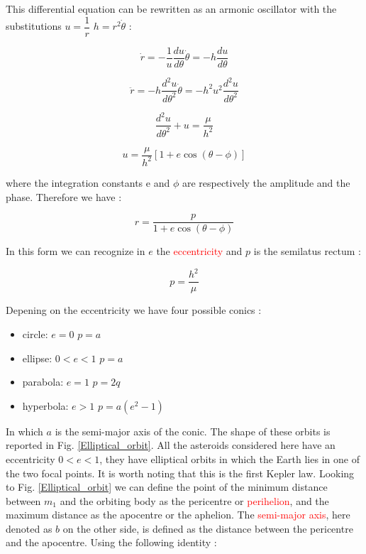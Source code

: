 \documentclass[12pt,%
               a4paper,%
               oneside,openany,%
               titlepage,%
               headinclude,footinclude,%
               BCOR5mm,%
               cleardoublepage=empty,%
               tablecaptionabove,%
               floatperchapter,
               ]{scrreprt}                 %
\begin{document}
This differential equation can be rewritten as an armonic oscillator with the  substitutions $u=\dfrac{1}{r}$ $h=r^{2}\dot{\theta}$ \cite{murray1999solar}:

\begin{equation}
\dot{r}=-\frac{1}{u}\dfrac{du}{d\theta}\dot{\theta}=-h\frac{du}{d\theta}
\end{equation}

\begin{equation}
\ddot{r}=-h\dfrac{d^{2}u}{d\theta^{2}}\dot{\theta}=-h^{2}u^{2}\frac{d^{2}u}{d\theta^{2}}
\end{equation}

\begin{equation}
\dfrac{d^{2}u}{d\theta^{2}}+u=\frac{\mu}{h^{2}}
\end{equation}

\begin{equation}
u=\frac{\mu}{h^{2}}\left[1+e\cos(\theta-\phi)\right]
\end{equation}

where the integration constants e and $\phi$ are respectively the amplitude and the phase. Therefore we have \cite{murray1999solar}:

\begin{equation}
r=\dfrac{p}{1+e\cos(\theta-\phi)}
\end{equation}

In this form we can recognize in $e$ the \textcolor{red}{eccentricity} and $p$ is the semilatus rectum \cite{murray1999solar}:

\begin{equation}
p=\frac{h^{2}}{\mu}
\end{equation}

Depening on the eccentricity we have four possible conics \cite{murray1999solar}:

\begin{itemize}
\item circle:  $e=0$ \quad $p=a$
\item ellipse: $0<e<1$ \quad $p=a$
\item parabola: $e=1$ \quad $p=2q$
\item hyperbola: $e>1$ \quad $p=a(e^{2}-1)$
\end{itemize}

In which $a$ is the semi-major axis of the conic. The shape of these orbits is reported in Fig. \ref{Elliptical_orbit}. All the asteroids considered here have an eccentricity $0<e<1$, they have elliptical orbits in which the Earth lies in one of the two focal points. It is worth noting that this is the first Kepler law.  Looking to Fig. \ref{Elliptical_orbit} we can define the point of the minimum distance between $m_{1}$ and the orbiting body as the pericentre or \textcolor{red}{perihelion}, and the maximum distance as the apocentre or the aphelion. The \textcolor{red}{semi-major axis}, here denoted as $b$ on the other side, is defined as the distance between the pericentre and the apocentre. Using the following identity \cite{murray1999solar}:
\end{document}
